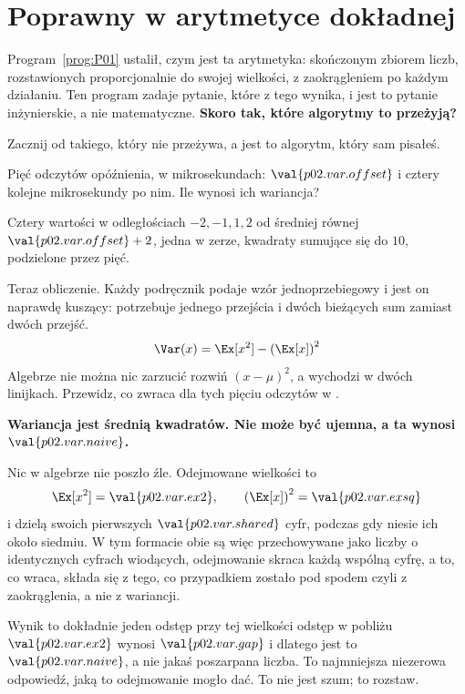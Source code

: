 \section{Poprawny w arytmetyce dokładnej}
\label{sec:P02-correct}

\begin{fr}
Program~\ref{prog:P01} ustalił, czym jest ta arytmetyka: skończonym zbiorem
liczb, rozstawionych proporcjonalnie do swojej wielkości, z zaokrągleniem po
każdym działaniu. Ten program zadaje pytanie, które z tego wynika, i jest to
pytanie inżynierskie, a nie matematyczne. \textbf{Skoro tak, które algorytmy to
przeżyją?}

Zacznij od takiego, który nie przeżywa, a jest to algorytm, który sam pisałeś.

Pięć odczytów opóźnienia, w mikrosekundach: $\val{p02.var.offset}$ i cztery
kolejne mikrosekundy po nim. Ile wynosi ich wariancja?
\nextframe
\end{fr}

\begin{fr}
Cztery wartości w odległościach $-2, -1, 1, 2$ od średniej równej
$\val{p02.var.offset} + 2$, jedna w zerze, kwadraty sumujące się do $10$,
podzielone przez pięć.

Teraz obliczenie. Każdy podręcznik podaje wzór jednoprzebiegowy i jest on
naprawdę kuszący: potrzebuje jednego przejścia i dwóch bieżących sum zamiast
dwóch przejść.
\[ \Var(x) = \Ex[x^{2}] - \left(\Ex[x]\right)^{2} \]
Algebrze nie można nic zarzucić \dash{} rozwiń $(x - \mu)^2$, a wychodzi w
dwóch linijkach. Przewidz, co zwraca dla tych pięciu odczytów w .
\nextframe
\end{fr}

\begin{fr}

\begin{trapbox}
\textbf{Wariancja jest średnią kwadratów. Nie może być ujemna, a ta wynosi
$\val{p02.var.naive}$.}

Nic w algebrze nie poszło źle. Odejmowane wielkości to
\[ \Ex[x^{2}] = \val{p02.var.ex2}, \qquad
   \left(\Ex[x]\right)^{2} = \val{p02.var.exsq} \]
i dzielą swoich pierwszych $\val{p02.var.shared}$ cyfr, podczas gdy
 niesie ich około siedmiu. W tym formacie obie są więc
przechowywane jako liczby o identycznych cyfrach wiodących, odejmowanie skraca
każdą wspólną cyfrę, a to, co wraca, składa się z tego, co przypadkiem zostało
pod spodem \dash{} czyli z zaokrąglenia, a nie z wariancji.

Wynik to dokładnie jeden odstęp przy tej wielkości \dash{} odstęp
 w pobliżu $\val{p02.var.ex2}$ wynosi $\val{p02.var.gap}$
\dash{} i dlatego jest to $\val{p02.var.naive}$, a nie jakaś poszarpana
liczba. To najmniejsza niezerowa odpowiedź, jaką to odejmowanie mogło dać. To
nie jest szum; to rozstaw.
\end{trapbox}
\end{fr}

